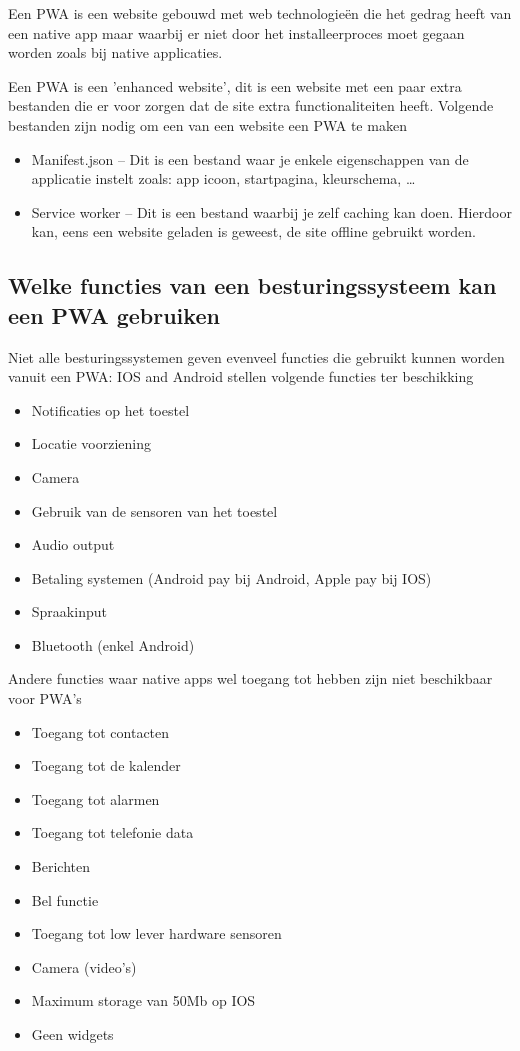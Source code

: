 Een PWA is een website gebouwd met web technologieën die het gedrag heeft van een native app maar waarbij er niet door het installeerproces moet gegaan worden zoals bij native applicaties.
\autocite{Sayali2018}

Een PWA is een 'enhanced website', dit is een website met een paar extra bestanden die er voor zorgen dat de site extra functionaliteiten heeft. Volgende bestanden zijn nodig om een van een website een PWA te maken
\begin{itemize}
    \item Manifest.json – Dit is een bestand waar je enkele eigenschappen van de applicatie instelt zoals: app icoon, startpagina, kleurschema, …
    \item Service worker – Dit is een bestand waarbij je zelf caching kan doen. Hierdoor kan, eens een website geladen is geweest, de site offline gebruikt worden.
\end{itemize}
\autocite{CodingTech2018}

\subsection{Welke functies van een besturingssysteem kan een PWA gebruiken}
Niet alle besturingssystemen geven evenveel functies die gebruikt kunnen worden vanuit een PWA: IOS and Android stellen volgende functies ter beschikking
\begin{itemize}
    \item Notificaties op het toestel
    \item Locatie voorziening
    \item Camera
    \item Gebruik van de sensoren van het toestel
    \item Audio output
    \item Betaling systemen (Android pay bij Android, Apple pay bij IOS)
    \item Spraakinput
    \item Bluetooth (enkel Android)
\end{itemize}
Andere functies waar native apps wel toegang tot hebben zijn niet beschikbaar voor PWA's
\begin{itemize}
    \item Toegang tot contacten
    \item Toegang tot de kalender
    \item Toegang tot alarmen
    \item Toegang tot telefonie data
    \item Berichten
    \item Bel functie
    \item Toegang tot low lever hardware sensoren
    \item Camera (video’s)
    \item Maximum storage van 50Mb op IOS
    \item Geen widgets
\end{itemize}


